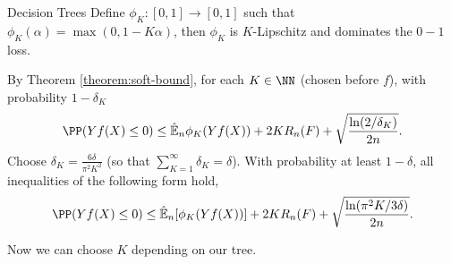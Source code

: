 \begin{frame}{Decision Trees}
Define $\phi_K:[0,1]\to [0,1]$ such that $\phi_K(\alpha)=\max(0,1-K\alpha)$, then $\phi_K$ is $K$-Lipschitz and dominates the $0-1$ loss.

By Theorem \ref{theorem:soft-bound}, for each $K\in \NN$ (chosen before $f$), with probability $1-\delta_K$
\[\PP(Yf(X)\le 0)\le\hat{\mathbb E}_n \phi_K(Yf(X))+2K R_n(F)+\sqrt{\frac{\ln(2/\delta_K)}{2n}}.
\]
Choose $\delta_K=\frac{6\delta}{\pi^2 K^2}$ (so that $\sum_{K=1}^\infty \delta_K = \delta$). With probability at least $1-\delta$, all inequalities of the following form hold,
\[\PP(Yf(X)\le 0)\le\hat{\mathbb E}_n[\phi_K(Yf(X))]+2K R_n(F)+\sqrt{\frac{\ln(\pi^2 K/3\delta)}{2n}}.
\]

Now we can choose $K$ depending on our tree.
\end{frame}




